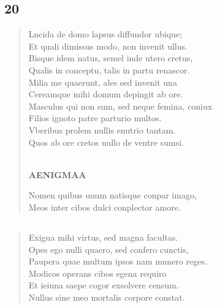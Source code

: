 \documentclass[11pt, a4paper]{report}
\begin{document}
            \subsection*{20}
      \begin{verse}
      Lncida de domo lapsus diffundor ubique; \\ Et quali dimissus modo, non invenit ullus. \\ Bisque idem natus, semel inde utero cretus, \\ Qualis in conceptu, talis in partu renascor. \\ Milia me quaerunt, ales sed invenit una \\ Cereamque mihi domum depingit ab ore. \\ Masculus qui non sum, sed neque femina, coniux \\ Filios ignoto patre parturio multos. \\ Vberibus prolem nullis enutrio tantam. \\ Quos ab ore cretos nullo de ventre sumsi. \\ 
        ﻿\pagebreak 
    \begin{center} \textbf{AENIGMAA} \end{center} \marginpar{[358]} Nomen quibus unum natisque conpar imago, \\ Meos inter cibos dulci conplector amore. \\ 
      \end{verse}
  
            \subsection*{}
      \begin{verse}
      Exigua mihi virtus, sed magna facultas. \\ Opes ego nulli quaero, sed confero cunctis, \\ Paupera quae multum ipsos nam munero reges. \\ Modicos operans cibos egena requiro \\ Et ieiuna saepe cogor exsolvere censum. \\ Nullus sine meo mortalis corpore constat. \\ 
      \end{verse}
  
\end{document}
